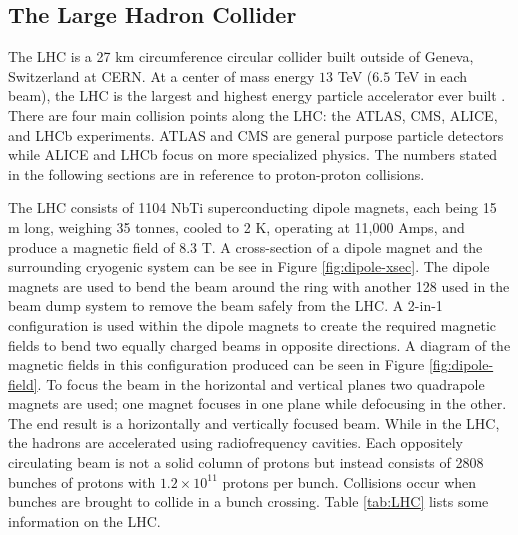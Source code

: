 
	\subsection{The Large Hadron Collider}\label{ssec:LHC}
		The \acrfull{LHC} is a 27 km circumference circular collider built outside of Geneva, Switzerland at \acrfull{CERN}. At a center of mass energy $13$ TeV ($6.5$ TeV in each beam), the \gls{LHC} is the largest and highest energy particle accelerator ever built \cite{lhc-machine}. There are four main collision points along the \gls{LHC}: the \gls{ATLAS}, \gls{CMS}, ALICE, and LHCb experiments. \gls{ATLAS} and \gls{CMS} are general purpose particle detectors while ALICE and LHCb focus on more specialized physics. The numbers stated in the following sections are in reference to proton-proton collisions.

		The LHC consists of 1104 NbTi superconducting dipole magnets, each being 15 m long, weighing 35 tonnes, cooled to 2 K, operating at 11,000 Amps, and produce a magnetic field of 8.3 T. A cross-section of a dipole magnet and the surrounding cryogenic system can be see in Figure \ref{fig:dipole-xsec}. The dipole magnets are used to bend the beam around the ring with another 128 used in the beam dump system to remove the beam safely from the \gls{LHC}. A 2-in-1 configuration is used within the dipole magnets to create the required magnetic fields to bend two equally charged beams in opposite directions. A diagram of the magnetic fields in this configuration produced can be seen in Figure \ref{fig:dipole-field}. To focus the beam in the horizontal and vertical planes two quadrapole magnets are used; one magnet focuses in one plane while defocusing in the other. The end result is a horizontally and vertically focused beam. While in the \gls{LHC}, the hadrons are accelerated using radiofrequency cavities. Each oppositely circulating beam is not a solid column of protons but instead consists of 2808 bunches of protons with $1.2 \times 10^{11}$ protons per bunch. Collisions occur when bunches are brought to collide in a bunch crossing. Table \ref{tab:LHC} lists some information on the \gls{LHC}. 

